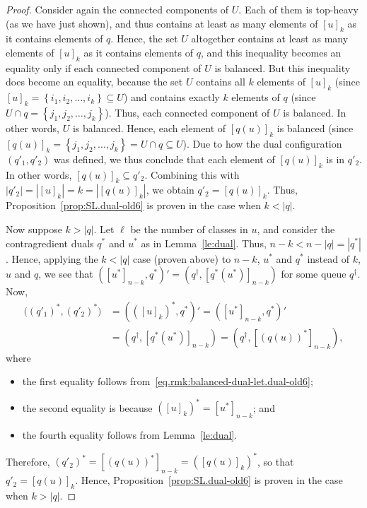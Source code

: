 \documentclass[reqno]{amsart}
\newcommand{\0}{\phantom{c}}
\newenvironment{verlong}{}{}
\newcommand{\set}[1]{\left\{ #1 \right\}}
\newcommand{\abs}[1]{\left| #1 \right|}
\newcommand{\tup}[1]{\left( #1 \right)}
\newcommand{\ive}[1]{\left[ #1 \right]}
\theoremstyle{plain}
\theoremstyle{definition}
\numberwithin{equation}{section}
\begin{document}
\begin{verlong}
\begin{proof}
Consider again the connected components of $U$. Each of them is top-heavy (as we have just shown), and thus contains at least as many elements of $[u]_k$ as it contains elements of $q$. Hence, the set $U$ altogether contains at least as many elements of $[u]_k$ as it contains elements of $q$, and this inequality becomes an equality only if each connected component of $U$ is balanced.
But this inequality does become an equality, because the set $U$ contains all $k$ elements of $[u]_k$ (since $[u]_k = \set{i_1, i_2, \ldots, i_k} \subseteq U$) and contains exactly $k$ elements of $q$ (since $U \cap q = \set{j_1, j_2, \ldots, j_k}$).
Thus, each connected component of $U$ is balanced. In other words, $U$ is balanced.
Hence, each element of $[q(u)]_k$ is balanced (since $[q(u)]_k = \set{j_1, j_2, \ldots, j_k} = U \cap q \subseteq U$).
Due to how the dual configuration $(q'_1, q'_2)$ was defined, we thus conclude that each element of $[q(u)]_k$ is in $q'_2$. In other words, $[q(u)]_k \subseteq q'_2$.
Combining this with $\abs{q'_2} = \abs{[u]_k} = k = \abs{[q(u)]_k}$, we obtain $q'_2 = [q(u)]_k$.
Thus, Proposition~\ref{prop:SL.dual-old6} is proven in the case when $k < \abs{q}$.

Now suppose $k > \abs{q}$.
Let $\ell$ be the number of classes in $u$, and consider the contragredient duals $q^*$ and $u^*$ as in Lemma~\ref{le:dual}.
Thus, $n-k < n - \abs{q} = \abs{q^*}$.
Hence, applying the $k < \abs{q}$ case (proven above)
to $n-k$, $u^*$ and $q^*$ instead of $k$, $u$ and $q$,
we see that
$\tup{ [u^*]_{n-k} , q^* }' = \tup{ q^\dagger , [q^*(u^*)]_{n-k} }$
for some queue $q^\dagger$.
Now,
\begin{align*}
 \bigl( (q'_1)^*, (q'_2)^* \bigr)
 &= \tup{ ([u]_k)^* , q^* }'
 = \tup{ [u^*]_{n-k} , q^* }' \\
 & = \tup{ q^\dagger , [q^*(u^*)]_{n-k} }
 = \tup{ q^\dagger , [(q(u))^*]_{n-k} } ,
\end{align*}
where
\begin{itemize}
 \item the first equality follows from~\eqref{eq.rmk:balanced-dual-let.dual-old6};
 \item the second equality is because $([u]_k)^* = [u^*]_{n-k}$; and
 \item the fourth equality follows from Lemma~\ref{le:dual}.
\end{itemize}
Therefore, $(q'_2)^* = [(q(u))^*]_{n-k} = ([q(u)]_k)^*$, so that
$q'_2 = [q(u)]_k$.
Hence, Proposition~\ref{prop:SL.dual-old6} is proven in the case when $k > \abs{q}$.
\end{proof}


\end{verlong}
\end{document}
